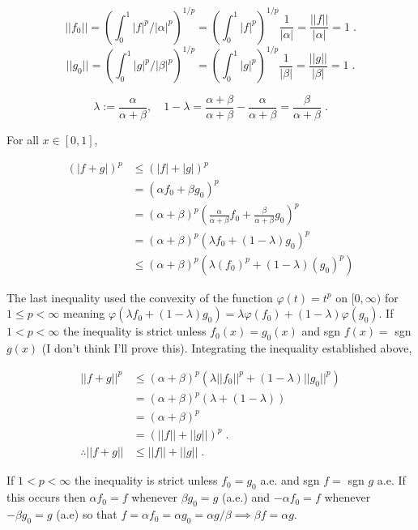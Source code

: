 \documentclass[a4paper]{article}
\begin{document}
$$||f_0|| = \left( \int_0^1 |f|^p / |\alpha|^p \right)^{1/p}  =  \left( \int_0^1 |f|^p  \right)^{1/p} \frac{1}{|\alpha|} = \frac{||f||}{|\alpha|}= 1 \;.$$
$$||g_0|| = \left( \int_0^1 |g|^p / |\beta|^p \right)^{1/p}  =  \left( \int_0^1 |g|^p  \right)^{1/p} \frac{1}{|\beta|} = \frac{||g||}{|\beta|}= 1 \;.$$


$$\lambda := \frac{\alpha}{\alpha + \beta}, \quad  1 - \lambda = \frac{\alpha + \beta}{\alpha + \beta} - \frac{\alpha}{\alpha + \beta} = \frac{\beta}{\alpha + \beta} \;.$$

For all $x \in [0,1]$, 

\begin{align*}
(|f+g|)^p & \leq (|f| + |g|)^p \\
& = (\alpha f_0 + \beta g_0)^p \\
&= (\alpha + \beta)^p\left(\frac{\alpha}{\alpha + \beta} f_0 + \frac{\beta}{\alpha + \beta} g_0\right)^p \\
&= (\alpha + \beta)^p\left(\lambda f_0 + (1-\lambda) g_0\right)^p \\
&\leq (\alpha + \beta)^p\left(\lambda (f_0)^p + (1-\lambda) (g_0)^p\right)
\end{align*}

The last inequality used the convexity of the function $\varphi (t) = t^p $ on $[0,\infty)$ for $1\leq p < \infty$ meaning $\varphi(\lambda f_0 + (1-\lambda) g_0) = \lambda \varphi(f_0) + (1-\lambda)\varphi(g_0)$. If $1< p < \infty$ the inequality is strict unless $f_0(x) = g_0(x)$ and sgn $f(x) = $ sgn $g(x)$ (I don't think I'll prove this). Integrating the inequality established above,

\begin{align*}
||f+g||^p &\leq (\alpha + \beta)^p \left( \lambda ||f_0||^p + (1-\lambda) ||g_0||^p\right)\\
&=(\alpha + \beta)^p \left( \lambda  + (1-\lambda)\right)\\ &= (\alpha + \beta)^p \\
&= (||f|| + ||g||)^p \;. \\
\therefore ||f+g|| &\leq ||f|| + ||g|| \;.
\end{align*}

If $1<p< \infty$ the inequality is strict unless $f_0 = g_0$ a.e. and sgn $f = $ sgn $g$ a.e. If this occurs then $\alpha f_0 = f$ whenever $\beta g_0 = g$ (a.e.) and $-\alpha f_0 = f$ whenever $-\beta g_0 = g$ (a.e) so that $f = \alpha f_0 = \alpha g_0  = \alpha g / \beta \implies \beta f = \alpha g$. \\
\end{document}
